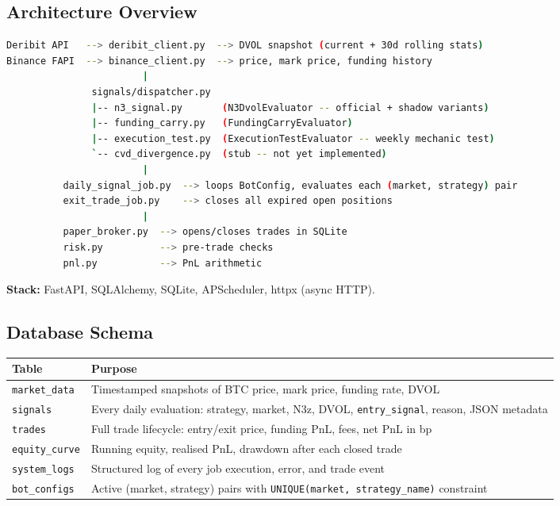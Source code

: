 \documentclass[11pt,a4paper]{article}
\newcommand{\code}[1]{\texttt{#1}}
\begin{document}
\subsection{Architecture Overview}

\begin{lstlisting}[language=bash, caption={Data flow}]
Deribit API   --> deribit_client.py  --> DVOL snapshot (current + 30d rolling stats)
Binance FAPI  --> binance_client.py  --> price, mark price, funding history
                        |
               signals/dispatcher.py
               |-- n3_signal.py       (N3DvolEvaluator -- official + shadow variants)
               |-- funding_carry.py   (FundingCarryEvaluator)
               |-- execution_test.py  (ExecutionTestEvaluator -- weekly mechanic test)
               `-- cvd_divergence.py  (stub -- not yet implemented)
                        |
          daily_signal_job.py  --> loops BotConfig, evaluates each (market, strategy) pair
          exit_trade_job.py    --> closes all expired open positions
                        |
          paper_broker.py  --> opens/closes trades in SQLite
          risk.py          --> pre-trade checks
          pnl.py           --> PnL arithmetic
\end{lstlisting}

\textbf{Stack:} FastAPI, SQLAlchemy, SQLite, APScheduler, httpx (async HTTP).

\subsection{Database Schema}

\begin{longtable}{@{}lp{9cm}@{}}
\toprule
\textbf{Table} & \textbf{Purpose} \\
\midrule
\endhead
\code{market\_data} & Timestamped snapshots of BTC price, mark price, funding rate, DVOL \\
\code{signals} & Every daily evaluation: strategy, market, N3z, DVOL, \code{entry\_signal}, reason, JSON metadata \\
\code{trades} & Full trade lifecycle: entry/exit price, funding PnL, fees, net PnL in bp \\
\code{equity\_curve} & Running equity, realised PnL, drawdown after each closed trade \\
\code{system\_logs} & Structured log of every job execution, error, and trade event \\
\code{bot\_configs} & Active (market, strategy) pairs with \code{UNIQUE(market, strategy\_name)} constraint \\
\bottomrule
\end{longtable}
\end{document}
